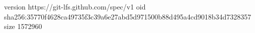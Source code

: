 version https://git-lfs.github.com/spec/v1
oid sha256:35770f4628ca49735f3c39a6e27abd5d971500b88d495a4cd9018b34d7328357
size 1572960
